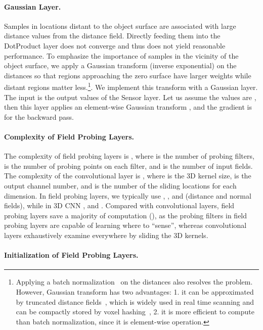 \documentclass{article}
\begin{document}
\paragraph{Gaussian Layer.} Samples in locations distant to the object surface are associated with large distance values from the distance field. Directly feeding them into the DotProduct layer does not converge and thus does not yield reasonable performance. To emphasize the importance of samples in the vicinity of the object surface, we apply a Gaussian transform (inverse exponential) on the distances so that regions approaching the zero surface have larger weights while distant regions matter less.\footnote{Applying a batch normalization~\cite{ioffe2015batch} on the distances also resolves the problem. However, Gaussian transform has two advantages: 1. it can be approximated by truncated distance fields~\cite{Curless_SIGGRAPH96_A}, which is widely used in real time scanning and can be compactly stored by voxel hashing~\cite{Niessner_ToG13_Real}, 2. it is more efficient to compute than batch normalization, since it is element-wise operation.}. We implement this transform with a Gaussian layer. The input is the output values of the Sensor layer. Let us assume the values are , then this layer applies an element-wise Gaussian transform , and the gradient is  for the backward pass.





\paragraph{Complexity of Field Probing Layers.} The complexity of field probing layers is , where  is the number of probing filters,  is the number of probing points on each filter, and  is the number of input fields. The complexity of the convolutional layer is , where  is the 3D kernel size,  is the output channel number, and  is the number of the sliding locations for each dimension. In field probing layers, we typically use , , and  (distance and normal fields), while in 3D CNN ,  and . Compared with convolutional layers, field probing layers save a majority of computation (), as the probing filters in field probing layers are capable of learning where to ``sense'', whereas convolutional layers exhaustively examine everywhere by sliding the 3D kernels.

\paragraph{Initialization of Field Probing Layers.}
\end{document}
